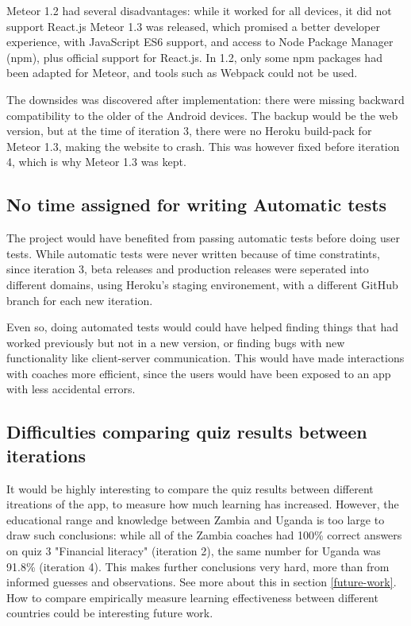 Meteor 1.2 had several disadvantages: while it worked for all devices, it did not support React.js Meteor 1.3 was released, which promised a better developer experience, with JavaScript ES6 support, and access to Node Package Manager (npm), plus official support for React.js. In 1.2, only some npm packages had been adapted for Meteor, and tools such as Webpack could not be used.

The downsides was discovered after implementation: there were missing backward compatibility to the older of the Android devices. The backup would be the web version, but at the time of iteration 3, there were no Heroku build-pack for Meteor 1.3, making the website to crash. This was however fixed before iteration 4, which is why Meteor 1.3 was kept.

\subsection{No time assigned for writing Automatic tests}
The project would have benefited from passing automatic tests before doing user tests. While automatic tests were never written because of time constratints, since iteration 3, beta releases and production releases were seperated into different domains, using Heroku's staging environement, with a different GitHub branch for each new iteration.

Even so, doing automated tests would could have helped finding things that had worked previously but not in a new version, or finding bugs with new functionality like client-server communication. This would have made interactions with coaches more efficient, since the users would have been exposed to an app with less accidental errors.

\subsection{Difficulties comparing quiz results between iterations}
It would be highly interesting to compare the quiz results between different itreations of the app, to measure how much learning has increased. However, the educational range and knowledge between Zambia and Uganda is too large to draw such conclusions: while all of the Zambia coaches had 100\% correct answers on quiz 3 "Financial literacy" (iteration 2), the same number for Uganda was 91.8\% (iteration 4). This makes further conclusions very hard, more than from informed guesses and observations. See more about this in section \ref{future-work}. How to compare empirically measure learning effectiveness between different countries could be interesting future work.

